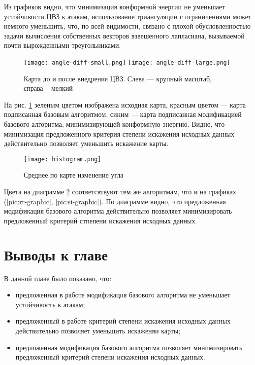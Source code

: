 Из графиков видно, что минимизация конформной энергии не уменьшает устойчивости ЦВЗ к атакам, использование триангуляции с ограничениями может немного
уменьшить, что, по всей видимости, связано с плохой обусловленностью задачи вычисления собственных векторов взвешенного лапласиана, 
вызываемой почти вырожденными треугольниками.

\begin{figure}[h]
    \centerline {
        \mbox{\texttt{[image: angle-diff-small.png]}}
        \mbox{\texttt{[image: angle-diff-large.png]}}
    }
    \caption{Карта до и после внедрения ЦВЗ. Слева --- крупный масштаб, справа -- мелкий}
    \label{pic:angle-diff}
\end{figure}

На рис. \ref{pic:angle-diff} зеленым цветом изображена исходная карта, красным цветом --- карта подписанная базовым алгоритмом, 
синим --- карта подписанная модификацией базового алгоритма, минимизирующей конформную энергию. Видно, 
что минимизация предложенного критерия степени искажения исходных данных действительно позволяет уменьшить искажение карты. 

\begin{figure}
    \centerline {
        \texttt{[image: histogram.png]}
    }
    \caption{Среднее по карте изменение угла}
    \label{pic:histogram}
\end{figure}

Цвета на диаграмме \ref{pic:histogram} соответсвтвуют тем же алгоритмам, что и на графиках (\ref{pic:rr-graphic}, \ref{pic:si-graphic}). 
По диаграмме видно, что предложенная модификация базового алгоритма действительно позволяет минимизировать предложенный критерий стпепени искажения 
исходных данных.

\section{Выводы к главе}
В данной главе было показано, что:
\begin{itemize}
    \item предложенная в работе модификация базового алгоритма не уменьшает устойчивость к атакам;
    \item предложенный в работе критерий степени искажения исходных данных действительно позволяет уменьшить искаженяи карты;
    \item предложенная модификация базового алгоритма позволяет минимизировать предложенный критерий степени искажения исходных данных.
\end{itemize}

